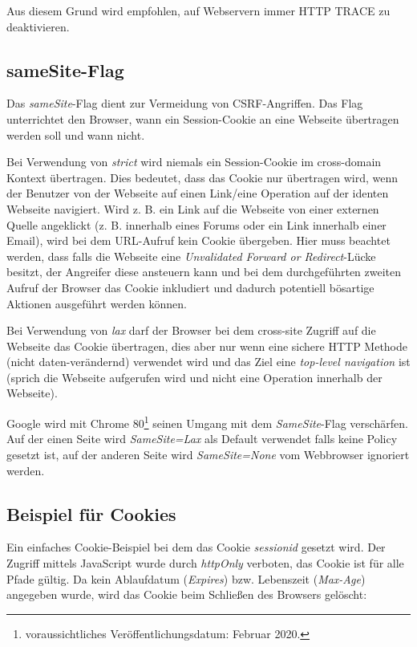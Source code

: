 Aus diesem Grund wird empfohlen, auf Webservern immer HTTP TRACE zu deaktivieren.

\subsection{sameSite-Flag}
\label{session_cookies_samesite}

Das \textit{sameSite}-Flag dient zur Vermeidung von CSRF-Angriffen. Das Flag unterrichtet den Browser, wann ein Session-Cookie an eine Webseite übertragen werden soll und wann nicht.

Bei Verwendung von \textit{strict} wird niemals ein Session-Cookie im cross-domain Kontext übertragen. Dies bedeutet, dass das Cookie nur übertragen wird, wenn der Benutzer von der Webseite auf einen Link/eine Operation auf der identen Webseite navigiert. Wird z. B. ein Link auf die Webseite von einer externen Quelle angeklickt (z. B. innerhalb eines Forums oder ein Link innerhalb einer Email), wird bei dem URL-Aufruf kein Cookie übergeben. Hier muss beachtet werden, dass falls die Webseite eine \textit{Unvalidated Forward or Redirect}-Lücke besitzt, der Angreifer diese ansteuern kann und bei dem durchgeführten zweiten Aufruf der Browser das Cookie inkludiert und dadurch potentiell bösartige Aktionen ausgeführt werden können.

Bei Verwendung von \textit{lax} darf der Browser bei dem cross-site Zugriff auf die Webseite das Cookie übertragen, dies aber nur wenn eine sichere HTTP Methode (nicht daten-verändernd) verwendet wird und das Ziel eine \textit{top-level navigation} ist (sprich die Webseite aufgerufen wird und nicht eine Operation innerhalb der Webseite).

Google wird mit Chrome 80\footnote{voraussichtliches Veröffentlichungsdatum: Februar 2020.} seinen Umgang mit dem \textit{SameSite}-Flag verschärfen. Auf der einen Seite wird \textit{SameSite=Lax} als Default verwendet falls keine Policy gesetzt ist, auf der anderen Seite wird \textit{SameSite=None} vom Webbrowser ignoriert werden.

\subsection{Beispiel für Cookies}

Ein einfaches Cookie-Beispiel bei dem das Cookie \textit{sessionid} gesetzt wird. Der Zugriff mittels JavaScript wurde durch \textit{httpOnly} verboten, das Cookie ist für alle Pfade gültig. Da kein Ablaufdatum (\textit{Expires}) bzw. Lebenszeit (\textit{Max-Age}) angegeben wurde, wird das Cookie beim Schließen des Browsers gelöscht:


